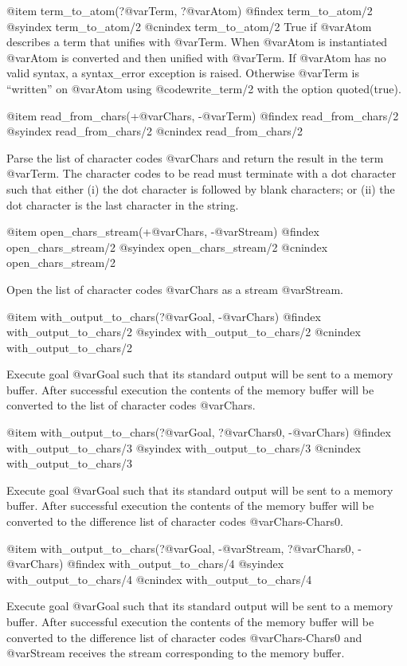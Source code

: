 {{{{{{{{@item term_to_atom(?@var{Term}, ?@var{Atom})
@findex term_to_atom/2
@syindex term_to_atom/2
@cnindex term_to_atom/2
True if @var{Atom} describes a term that unifies with @var{Term}. When
@var{Atom} is instantiated @var{Atom} is converted and then unified with
@var{Term}. If @var{Atom} has no valid syntax, a syntax_error exception
is raised. Otherwise @var{Term} is ``written'' on @var{Atom} using
@code{write_term/2} with the option quoted(true).

@item read_from_chars(+@var{Chars}, -@var{Term})
@findex read_from_chars/2
@syindex read_from_chars/2
@cnindex read_from_chars/2

Parse the list of character codes @var{Chars} and return the result in
the term @var{Term}. The character codes to be read must terminate with
a dot character such that either (i) the dot character is followed by
blank characters; or (ii) the dot character is the last character in the
string.

@item open_chars_stream(+@var{Chars}, -@var{Stream})
@findex open_chars_stream/2
@syindex open_chars_stream/2
@cnindex open_chars_stream/2

Open the list of character codes @var{Chars} as a stream @var{Stream}.

@item with_output_to_chars(?@var{Goal}, -@var{Chars})
@findex with_output_to_chars/2
@syindex with_output_to_chars/2
@cnindex with_output_to_chars/2

Execute goal @var{Goal} such that its standard output will be sent to a
memory buffer. After successful execution the contents of the memory
buffer will be converted to the list of character codes @var{Chars}.

@item with_output_to_chars(?@var{Goal}, ?@var{Chars0}, -@var{Chars})
@findex with_output_to_chars/3
@syindex with_output_to_chars/3
@cnindex with_output_to_chars/3

Execute goal @var{Goal} such that its standard output will be sent to a
memory buffer. After successful execution the contents of the memory
buffer will be converted to the difference list of character codes
@var{Chars-Chars0}.

@item with_output_to_chars(?@var{Goal}, -@var{Stream}, ?@var{Chars0}, -@var{Chars})
@findex with_output_to_chars/4
@syindex with_output_to_chars/4
@cnindex with_output_to_chars/4

Execute goal @var{Goal} such that its standard output will be sent to a
memory buffer. After successful execution the contents of the memory
buffer will be converted to the difference list of character codes
@var{Chars-Chars0} and @var{Stream} receives the stream corresponding to
the memory buffer.

}}}}}}}}
